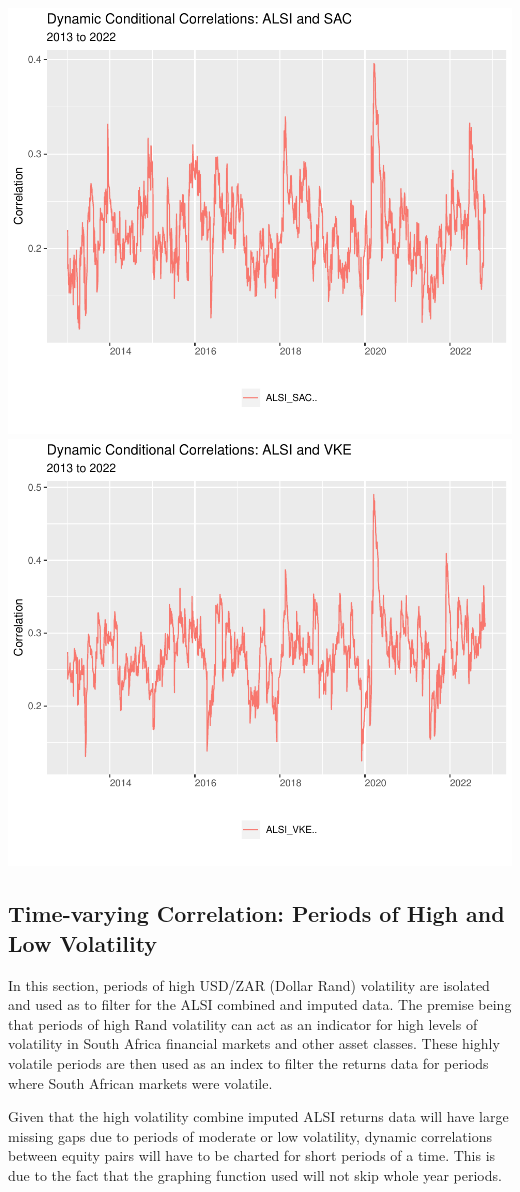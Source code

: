 \documentclass[11pt,preprint, authoryear]{elsarticle}
\numberwithin{equation}{section}
\numberwithin{figure}{section}
\numberwithin{table}{section}
\begin{document}
\includegraphics[width=0.5\linewidth]{Fin_Metrics_Project_files/figure-latex/figures-side-5}
\includegraphics[width=0.5\linewidth]{Fin_Metrics_Project_files/figure-latex/figures-side-6}

\hypertarget{time-varying-correlation-periods-of-high-and-low-volatility}{%
\subsection{Time-varying Correlation: Periods of High and Low
Volatility}\label{time-varying-correlation-periods-of-high-and-low-volatility}}

In this section, periods of high USD/ZAR (Dollar Rand) volatility are
isolated and used as to filter for the ALSI combined and imputed data.
The premise being that periods of high Rand volatility can act as an
indicator for high levels of volatility in South Africa financial
markets and other asset classes. These highly volatile periods are then
used as an index to filter the returns data for periods where South
African markets were volatile.

Given that the high volatility combine imputed ALSI returns data will
have large missing gaps due to periods of moderate or low volatility,
dynamic correlations between equity pairs will have to be charted for
short periods of a time. This is due to the fact that the graphing
function used will not skip whole year periods.
\end{document}

